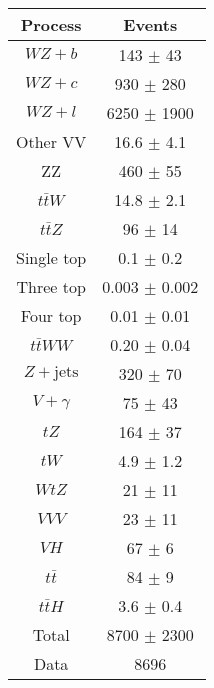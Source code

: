 \begin{center}
\begin{tabular}{|c|c|}
\hline
Process & Events \\
\hline 
  $WZ + b$   & 143 $\pm$ 43 \\
  $WZ + c$   & 930 $\pm$ 280 \\
  $WZ + l$   & 6250 $\pm$ 1900 \\
  Other VV   & 16.6 $\pm$ 4.1 \\
  ZZ   & 460 $\pm$ 55 \\
  $t\bar{t}W$   & 14.8 $\pm$ 2.1 \\
  $t\bar{t}Z$   & 96 $\pm$ 14 \\
  Single top   & 0.1 $\pm$ 0.2 \\
  Three top   & 0.003 $\pm$ 0.002 \\
  Four top   & 0.01 $\pm$ 0.01 \\
  $t\bar{t}WW$   & 0.20 $\pm$ 0.04 \\
  $Z+\text{jets}$   & 320 $\pm$ 70 \\
  $V+\gamma$   & 75 $\pm$ 43 \\
  $tZ$   & 164 $\pm$ 37 \\
  $tW$   & 4.9 $\pm$ 1.2 \\
  $WtZ$   & 21 $\pm$ 11 \\
  $VVV$   & 23 $\pm$ 11 \\
  $VH$   & 67 $\pm$ 6 \\
  $t\bar{t}$   & 84 $\pm$ 9 \\
  $t\bar{t}H$   & 3.6 $\pm$ 0.4 \\
\hline
  Total  & 8700 $\pm$ 2300 \\
\hline
  Data   & 8696 \\


\end{tabular}
\end{center}
